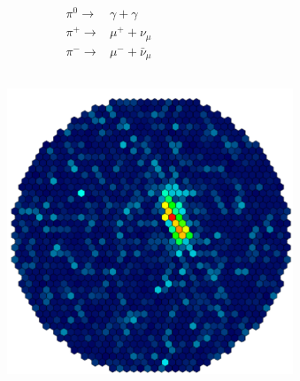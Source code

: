 \documentclass[aspectratio=1610, professionalfonts, 9pt]{beamer}
\begin{document}
\begin{frame}
\begin{columns}
\begin{figure}
	  \caption{\cite{FACT}}
	\end{figure}
	\begin{eqnarray*}
	  \pi^{0} \rightarrow& \gamma + \gamma \\
	  \pi^{+} \rightarrow& \mu^{+} + \nu_{\mu} \\
	  \pi^{-} \rightarrow& \mu^{-} + \bar{\nu}_{\mu}
	\end{eqnarray*}
  \end{columns}
\end{frame}

\begin{frame}
  \begin{columns}
	\begin{figure}
	  \centering
	  \includegraphics[height=0.8\textheight]{./images/Gamma.pdf}
	  \caption{\cite{FACT}}
	\end{figure}
	\begin{figure}
	  \centering

\end{figure}
\end{columns}
\end{frame}
\end{document}
